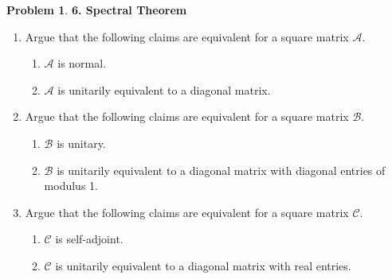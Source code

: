\documentclass{article}
\theoremstyle{definition}
\newtheorem*{prob*}{Problem}
\newcommand{\A}{\mathcal{A}}
\newcommand{\B}{\mathcal{B}}
\begin{document}
\newpage

\begin{prob*}\textbf{6. Spectral Theorem }
	\begin{enumerate}
		\item Argue that the following claims are equivalent for a square matrix $\A$.
		\begin{enumerate}
			\item $\A$ is normal.
			\item $\A$ is unitarily equivalent to a diagonal matrix.
		\end{enumerate}
	
		\item Argue that the following claims are equivalent for a square matrix $\B$.
		\begin{enumerate}
			\item $\B$ is unitary.
			\item $\B$ is unitarily equivalent to a diagonal matrix with diagonal entries of modulus 1. 
		\end{enumerate}
	
	
		\item Argue that the following claims are equivalent for a square matrix $\mathcal{C}$.
		\begin{enumerate}
			\item $\mathcal{C}$ is self-adjoint.
			\item $\mathcal{C}$ is unitarily equivalent to a diagonal matrix with real entries. 
		\end{enumerate} 
	\end{enumerate}
\end{prob*}





\newpage
\end{document}
